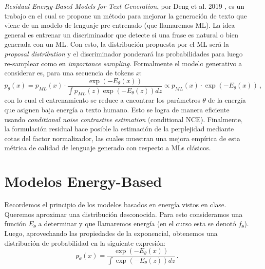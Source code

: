\documentclass[letterpaper,11pt,oneside]{article}
\theoremstyle{break}
\begin{document}
	





\inserttitle

\textit{Residual Energy-Based Models for Text Generation}, por Deng et al. 2019 \cite{paper}, es un trabajo en el cual se propone un método para mejorar la generación de texto que viene de un modelo de lenguaje pre-entrenado (que llamaremos ML). La idea general es entrenar un discriminador que detecte si una frase es natural o bien generada con un ML. Con esto, la distribución propuesta por el ML será la \textit{proposal distribution} y el discriminador ponderará las probabilidades para luego re-samplear como en \textit{importance sampling}. Formalmente el modelo generativo a considerar es, para una secuencia de tokens $x$:
\begin{equation}
\label{eq:model}
    p_\theta(x) =  p_{ML}(x) \cdot \frac{\exp(-E_\theta(x))}{\int p_{ML}(z)\exp(-E_\theta(z))dz} \propto p_{ML}(x) \cdot \exp(-E_\theta(x)) \,,
\end{equation}
con lo cual el entrenamiento se reduce a encontrar los parámetros $\theta$ de la energía que asignen baja energía a texto humano. Esto se logra de manera eficiente usando \textit{conditional noise contrastive estimation} (conditional NCE). Finalmente, la formulación residual hace posible la estimación de la perplejidad mediante cotas del factor normalizador, las cuales muestran una mejora empírica de esta métrica de calidad de lenguaje generado con respecto a MLs clásicos.

\section{Modelos Energy-Based}
\label{section:energy}
Recordemos el principio de los modelos basados en energía vistos en clase. Queremos aproximar una distribución desconocida. Para esto consideramos una función $E_\theta$ a determinar y que llamaremos energía (en el curso esta se denotó $f_\theta$). Luego, aprovechando las propiedades de la exponencial, obtenemos una distribución de probabilidad en la siguiente expresión:
$$ p_\theta(x) = \frac{\exp(-E_\theta(x))}{\int \exp(-E_\theta(z))dz}\,.$$
\end{document}
